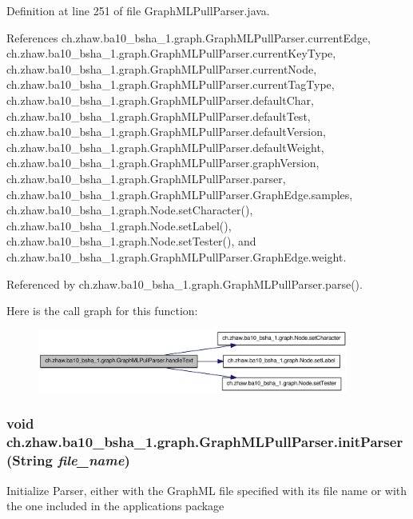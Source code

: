 Definition at line 251 of file GraphMLPullParser.java.

References ch.zhaw.ba10\_\-bsha\_\-1.graph.GraphMLPullParser.currentEdge, ch.zhaw.ba10\_\-bsha\_\-1.graph.GraphMLPullParser.currentKeyType, ch.zhaw.ba10\_\-bsha\_\-1.graph.GraphMLPullParser.currentNode, ch.zhaw.ba10\_\-bsha\_\-1.graph.GraphMLPullParser.currentTagType, ch.zhaw.ba10\_\-bsha\_\-1.graph.GraphMLPullParser.defaultChar, ch.zhaw.ba10\_\-bsha\_\-1.graph.GraphMLPullParser.defaultTest, ch.zhaw.ba10\_\-bsha\_\-1.graph.GraphMLPullParser.defaultVersion, ch.zhaw.ba10\_\-bsha\_\-1.graph.GraphMLPullParser.defaultWeight, ch.zhaw.ba10\_\-bsha\_\-1.graph.GraphMLPullParser.graphVersion, ch.zhaw.ba10\_\-bsha\_\-1.graph.GraphMLPullParser.parser, ch.zhaw.ba10\_\-bsha\_\-1.graph.GraphMLPullParser.GraphEdge.samples, ch.zhaw.ba10\_\-bsha\_\-1.graph.Node.setCharacter(), ch.zhaw.ba10\_\-bsha\_\-1.graph.Node.setLabel(), ch.zhaw.ba10\_\-bsha\_\-1.graph.Node.setTester(), and ch.zhaw.ba10\_\-bsha\_\-1.graph.GraphMLPullParser.GraphEdge.weight.

Referenced by ch.zhaw.ba10\_\-bsha\_\-1.graph.GraphMLPullParser.parse().

Here is the call graph for this function:\nopagebreak
\begin{figure}[H]
\begin{center}
\leavevmode
\includegraphics[width=290pt]{classch_1_1zhaw_1_1ba10__bsha__1_1_1graph_1_1GraphMLPullParser_a06f1ee797fdd3fe07b3665cbaf3413d9_cgraph}
\end{center}
\end{figure}
\hypertarget{classch_1_1zhaw_1_1ba10__bsha__1_1_1graph_1_1GraphMLPullParser_adbe40e63ba94ad70d3dfc64b37c098b8}{
\subsubsection[{initParser}]{\setlength{\rightskip}{0pt plus 5cm}void ch.zhaw.ba10\_\-bsha\_\-1.graph.GraphMLPullParser.initParser (String {\em file\_\-name})}}
\label{classch_1_1zhaw_1_1ba10__bsha__1_1_1graph_1_1GraphMLPullParser_adbe40e63ba94ad70d3dfc64b37c098b8}
Initialize Parser, either with the GraphML file specified with its file name or with the one included in the applications package


